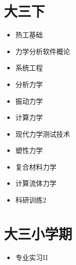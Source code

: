 \documentclass[a4paper, 12pt]{article}
\begin{document}
{		\section*{大三下}
		\begin{itemize}
			\item 热工基础
			\item 力学分析软件概论
			\item 系统工程
			\item 分析力学
			\item 振动力学
			\item 计算力学
			\item 现代力学测试技术
			\item 塑性力学
			\item 复合材料力学
			\item 计算流体力学
			\item 科研训练2
		\end{itemize}
		
		\section*{大三小学期}
		\begin{itemize}
			\item 专业实习II
		\end{itemize}
	}
	
\end{document}
